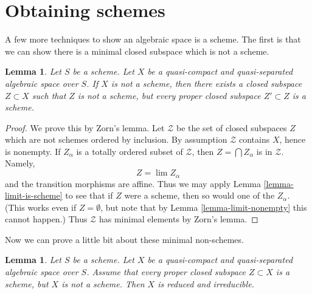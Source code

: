 \documentclass{stacks-project}
\theoremstyle{plain}
\newtheorem{lemma}[subsection]{Lemma}
\theoremstyle{definition}
\theoremstyle{remark}
\numberwithin{equation}{subsection}
\def\lim{\mathop{\mathrm{lim}}\nolimits}
\begin{document}
\section{Obtaining schemes}
\label{section-representable}

\noindent
A few more techniques to show an algebraic space is a scheme.
The first is that we can show there is a minimal closed subspace
which is not a scheme.

\begin{lemma}
\label{lemma-minimal-closed-subspace}
Let $S$ be a scheme. Let $X$ be a quasi-compact and quasi-separated
algebraic space over $S$. If $X$ is not a scheme, then there exists
a closed subspace $Z \subset X$ such that $Z$ is not a scheme, but
every proper closed subspace $Z' \subset Z$ is a scheme.
\end{lemma}

\begin{proof}
We prove this by Zorn's lemma. Let $\mathcal{Z}$ be the set
of closed subspaces $Z$ which are not schemes ordered by inclusion.
By assumption $\mathcal{Z}$ contains $X$, hence is nonempty.
If $Z_\alpha$ is a totally ordered subset of $\mathcal{Z}$, then
$Z = \bigcap Z_\alpha$ is in $\mathcal{Z}$. Namely,
$$
Z = \lim Z_\alpha
$$
and the transition morphisms are affine.
Thus we may apply Lemma \ref{lemma-limit-is-scheme} to see that if $Z$
were a scheme, then so would one of the $Z_\alpha$.
(This works even if $Z = \emptyset$, but note that by
Lemma \ref{lemma-limit-nonempty} this cannot happen.)
Thus $\mathcal{Z}$ has minimal elements by Zorn's lemma.
\end{proof}

\noindent
Now we can prove a little bit about these minimal non-schemes.

\begin{lemma}
\label{lemma-minimal-nonscheme}
Let $S$ be a scheme. Let $X$ be a quasi-compact and quasi-separated
algebraic space over $S$. Assume that every proper closed subspace
$Z \subset X$ is a scheme, but $X$ is not a scheme. Then $X$ is reduced
and irreducible.
\end{lemma}
\end{document}
